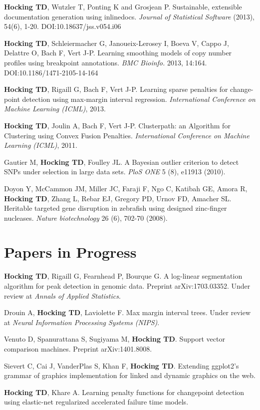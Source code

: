 \documentclass[margin,line]{res}
\begin{document}
\begin{resume}
{\bf Hocking TD}, Wutzler T, Ponting K and Grosjean P. Sustainable,
extensible documentation generation using inlinedocs. {\it Journal of
Statistical Software} (2013), 54(6), 1-20. DOI:10.18637/jss.v054.i06

{\bf Hocking TD}, Schleiermacher G, Janoueix-Lerosey I, Boeva V, Cappo
J, Delattre O, Bach F, Vert J-P. Learning smoothing models of copy
number profiles using breakpoint annotations. {\it BMC Bioinfo.} 2013,
14:164. DOI:10.1186/1471-2105-14-164

{\bf Hocking TD}, Rigaill G, Bach F, Vert J-P. Learning sparse
penalties for change-point detection using max-margin interval
regression. {\it International Conference on Machine Learning (ICML)}, 2013.

{\bf Hocking TD}, Joulin A, Bach F, Vert J-P. Clusterpath: an
Algorithm for Clustering using Convex Fusion Penalties. {\it International Conference on Machine Learning (ICML)}, 2011.

Gautier M, {\bf Hocking TD}, Foulley JL. A Bayesian outlier criterion
to detect SNPs under selection in large data sets. {\it PloS ONE} 5
(8), e11913 (2010).

Doyon Y, McCammon JM, Miller JC, Faraji F, Ngo C, Katibah GE, Amora R,
{\bf Hocking TD}, Zhang L, Rebar EJ, Gregory PD, Urnov FD, Amacher
SL. Heritable targeted gene disruption in zebrafish using designed
zinc-finger nucleases. {\it Nature biotechnology} 26 (6), 702-70
(2008).

\section{\sc Papers in Progress}

{\bf Hocking TD}, Rigaill G, Fearnhead P, Bourque G. A log-linear
segmentation algorithm for peak detection in genomic data. Preprint
arXiv:1703.03352. Under review at {\it Annals of Applied Statistics}.

Drouin A, {\bf Hocking TD}, Laviolette F. Max margin interval
trees. Under review at {\it Neural Information Processing Systems (NIPS)}.

Venuto D, Spanurattana S, Sugiyama M, {\bf Hocking TD}. Support vector
comparison machines. Preprint arXiv:1401.8008. 

Sievert C, Cai J, VanderPlas S, Khan F, {\bf Hocking TD}. Extending ggplot2's
grammar of graphics implementation for linked and dynamic graphics on
the web.

{\bf Hocking TD}, Khare A. Learning penalty functions for changepoint
detection using elastic-net regularized accelerated failure time
models.


\end{resume}
\end{document}
